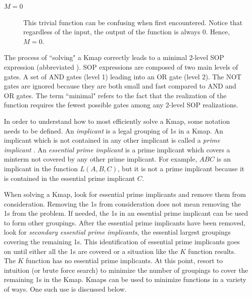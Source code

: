 \begin{process:minimizationKmap}
\begin{description}
\item [$M=0$] 
This trivial function can be confusing when first encountered.
Notice that regardless of the input, the output of the function 
is always 0.  Hence, $M=0$.
\end{description}

The process of ``solving" a Kmap correctly leads to a minimal 2-level 
SOP expression (abbreviated \SOPmin).  SOP expressions are composed
of two main levels of gates. A set of AND gates (level 1) leading 
into an OR gate (level 2).  The NOT gates are ignored because they are 
both small and fast compared to AND and OR gates.  The term ``minimal"
refers to the fact that the realization of the function requires 
the fewest possible gates among any 2-level SOP realizations.  

In order to understand how to most efficiently solve a Kmap, some
notation needs to be defined.
An {\it implicant}  is a legal grouping of 1s in 
a Kmap.  An implicant which is not contained in any other implicant 
is called a {\it prime implicant} .  An 
{\it essential prime implicant}  
is a prime implicant which covers a minterm not covered by any other 
prime implicant. For example, $ABC$ is an implicant in the function 
$L(A,B,C)$, but it is not a prime implicant because it is contained in 
the essential prime implicant $C$.

When solving a Kmap, look for essential prime implicants and 
remove them from consideration.  Removing the 1s from consideration does not
mean removing the 1s from the problem.  If needed, the 1s in an essential
prime implicant can be used to form other groupings.
After the essential prime implicants 
have been removed, look for {\it secondary essential prime implicants}, 
the essential largest groupings covering the remaining 1s.
 This identification of essential
prime implicants goes on until either all the 1s are covered or 
a situation like the $K$ function results.  The $K$ function has no 
essential prime implicants.  At this point, resort to intuition 
(or brute force search) to minimize the number of groupings
to cover the remaining 1s in the Kmap.  Kmaps can be used to 
minimize functions in a variety of ways.  One such use is discussed below.


\end{process:minimizationKmap}
